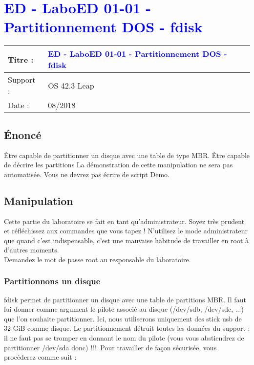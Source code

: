 \lstset{language=c}
\renewcommand{\titre}{\textcolor{blue}{ ED - LaboED 01-01 - Partitionnement DOS - fdisk}}

\lhead{ \titre }
\section{{\titre} }

\begin{tabular}{|l|l|}
\hline
Titre : 	& \titre \\\hline
Support : 	& OS 42.3 Leap\\\hline
Date :		& 08/2018 \\\hline
\end{tabular}

\subsection{Énoncé}

Être capable de partitionner un disque avec une table de type MBR. Être capable de décrire les partitions
La démonstration de cette manipulation ne sera pas automatisée. Vous ne devrez pas écrire de script Demo.

\subsection{Manipulation}

Cette partie du laboratoire se fait en tant qu'administrateur. Soyez très prudent et réfléchissez aux commandes que vous tapez !
N'utilisez le mode administrateur que quand c'est indispensable, c'est une mauvaise habitude de travailler en root à d'autres moments.\\
Demandez le mot de passe root au responsable du laboratoire.

\subsubsection{Partitionnons un disque}

fdisk permet de partitionner un disque avec une table de partitions MBR. Il faut lui donner comme argument le pilote associé au disque (/dev/sdb, /dev/sdc, ...) que l'on souhaite partitionner. Ici, nous utiliserons uniquement des stick usb de 32 GiB comme disque. Le partitionnement détruit toutes les données du support : il ne faut pas se tromper en donnant le nom du pilote (vous vous abstiendrez de partitionner /dev/sda donc) !!!. Pour travailler de façon sécurisée, vous procéderez comme suit :


